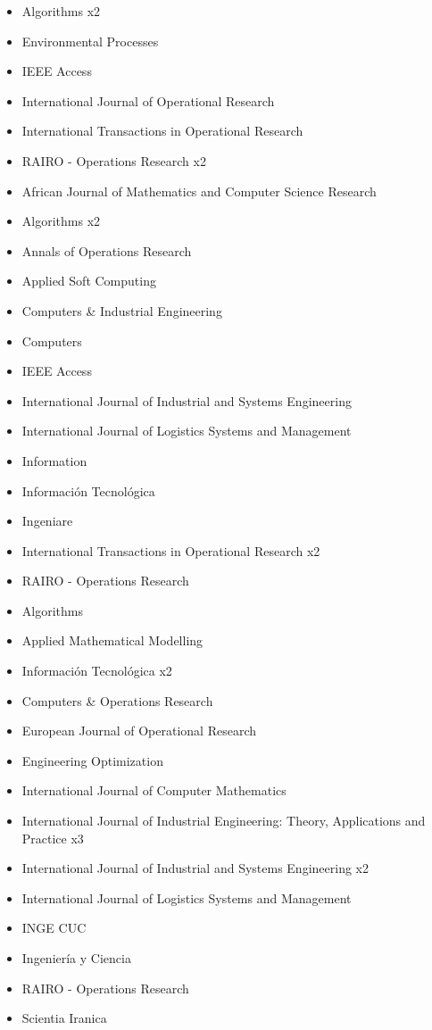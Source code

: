 {\begin{itemize}
\item Algorithms x2
\item Environmental Processes
\item IEEE Access
\item International Journal of Operational Research
\item International Transactions in Operational Research
\item RAIRO - Operations Research x2
\end{itemize}
}

{\begin{itemize}
\item African Journal of Mathematics and Computer Science Research
\item Algorithms x2
\item Annals of Operations Research
\item Applied Soft Computing
\item Computers \& Industrial Engineering
\item Computers
\item IEEE Access
\item International Journal of Industrial and Systems Engineering
\item International Journal of Logistics Systems and Management 
\item Information
\item Informaci\'on Tecnol\'ogica
\item Ingeniare
\item International Transactions in Operational Research x2
\item RAIRO - Operations Research
\end{itemize}
}

{\begin{itemize}
\item Algorithms
\item Applied Mathematical Modelling
\item Informaci\'on Tecnol\'ogica x2
\item Computers \& Operations Research
\item European Journal of Operational Research
\item Engineering Optimization
\item International Journal of Computer Mathematics
\item International Journal of Industrial Engineering: Theory, Applications and Practice x3
\item International Journal of Industrial and Systems Engineering x2
\item International Journal of Logistics Systems and Management 
\item INGE CUC
\item Ingenier\'ia y Ciencia
\item RAIRO - Operations Research
\item Scientia Iranica
\end{itemize}
}

